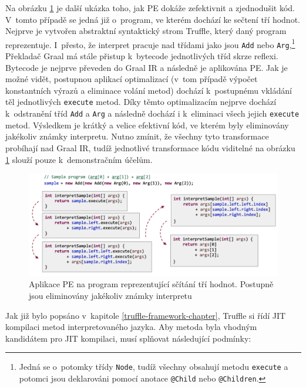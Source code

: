 \documentclass[
  master,
  biblatex,
  figures=true,
  theorems,
  sourcecodes,
  glossaries,
  index
]{kidiplom}
\begin{document}
Na obrázku \ref{fig:pe-example-2} je další ukázka toho, jak PE dokáže zefektivnit a zjednodušit kód. V~tomto případě se jedná již o~program, ve kterém dochází ke sečtení tří hodnot. Nejprve je vytvořen abstraktní syntaktický strom Truffle, který daný program reprezentuje. I~přesto, že interpret pracuje nad třídami jako jsou \texttt{Add} nebo \texttt{Arg},\footnote{Jedná se o~potomky třídy \texttt{Node}, tudíž všechny obsahují metodu \texttt{execute} a potomci jsou deklarováni pomocí anotace \texttt{@Child} nebo \texttt{@Children}.} Překladač Graal má stále přistup k~bytecode jednotlivých tříd skrze reflexi. Bytecode je nejprve převeden do Graal IR a následně je aplikována PE. Jak je možné vidět, postupnou aplikací optimalizací (v~tom případě výpočet konstantních výrazů a eliminace volání metod) dochází k~postupnému vkládání těl jednotlivých \texttt{execute} metod. Díky těmto optimalizacím nejprve dochází k~odstranění tříd \texttt{Add} a \texttt{Arg} a následně dochází i k~eliminaci všech jejich \texttt{execute} metod. Výsledkem je krátký a velice efektivní kód, ve kterém byly eliminovány jakékoliv známky interpretu. Nutno zmínit, že všechny tyto transformace probíhají nad Graal IR, tudíž jednotlivé transformace kódu viditelné na obrázku \ref{fig:pe-example-2} slouží pouze k~demonstračním účelům.  

\newpage

\begin{figure} [h]
    \centering
    \includegraphics[width= 1\textwidth]{images/pe-example-2.png}
    \caption{Aplikace PE na program reprezentující sčítání tří hodnot. Postupně jsou eliminovány jakékoliv známky interpretu \cite{truffle-pe-presentation}}
    \label{fig:pe-example-2}
\end{figure}

Jak již bylo popsáno v~kapitole \ref{truffle-framework-chapter}, Truffle si řídí JIT kompilaci metod interpretovaného jazyka. Aby metoda byla vhodným kandidátem pro JIT kompilaci, musí splňovat následující podmínky:
\end{document}
